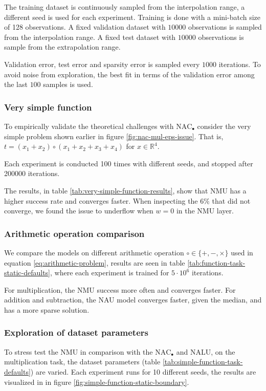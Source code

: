 The training dataset is continuously sampled from the interpolation range, a different seed is used for each experiment. Training is done with a mini-batch size of 128 observations. A fixed validation dataset with $10000$ observations is sampled from the interpolation range. A fixed test dataset with $10000$ observations is sample from the extrapolation range.

Validation error, test error and sparsity error is sampled every $1000$ iterations. To avoid noise from exploration, the best fit in terms of the validation error among the last $100$ samples is used.

\subsubsection{Very simple function}

To empirically validate the theoretical challenges with $\mathrm{NAC}_{\bullet}$ consider the very simple problem shown earlier in figure \ref{fig:nac-mul-eps-issue}. That is, $t = (x_1 + x_2) \circ (x_1 + x_2 + x_3 + x_4)$ for $x \in \mathbb{R}^4$.

Each experiment is conducted 100 times with different seeds, and stopped after 200000 iterations.

The results, in table \ref{tab:very-simple-function-results}, show that NMU has a higher success rate and converges faster. When inspecting the $6\%$ that did not converge, we found the issue to underflow when $w = 0$ in the NMU layer.


\subsubsection{Arithmetic operation comparison}
We compare the models on different arithmetic operation $\circ \in \{+, -, \times\}$ used in equation \ref{eq:arithmetic-problem}, results are seen in table \ref{tab:function-task-static-defaults}, where each experiment is trained for $5 \cdot 10^6$ iterations.

For multiplication, the NMU success more often and converges faster. For addition and subtraction, the NAU model converges faster, given the median, and has a more sparse solution.



\subsubsection{Exploration of dataset parameters}
To stress test the NMU in comparison with the  $\mathrm{NAC}_{\bullet}$ and NALU, on the multiplication task, the dataset parameters (table \ref{tab:simple-function-task-defaults}) are varied. Each experiment runs for 10 different seeds, the results are visualized in in figure \ref{fig:simple-function-static-boundary}.

